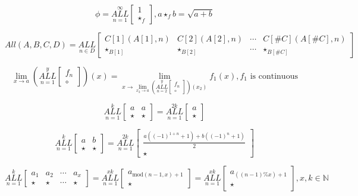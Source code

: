 \documentclass{article}
\begin{document}
$$\phi=\underset{n=1}{\overset{\infty}{ALL}} \begin{bmatrix}
1 \\
\star_f
\end{bmatrix}, a \star_f b = \sqrt{a+b}$$

$$All(A, B, C, D)=\underset{n \in D}{ALL} \begin{bmatrix}
C[1](A[1],n) & C[2](A[2],n) & \cdots & C[\#C](A[\#C],n) \\
\star_{B[1]}& \star_{B[2]} & \cdots & \star_{B[\#C]}
\end{bmatrix}$$

$$\underset{x \rightarrow a}{\lim} (\underset{n=1}{\overset{y}{ALL}} \begin{bmatrix}
f_n \\
\circ
\end{bmatrix})(x) = \underset{x \rightarrow \underset{x_2 \rightarrow a}{\lim} (\underset{n=2}{\overset{y}{ALL}} \begin{bmatrix}
f_n \\
\circ
\end{bmatrix})(x_2)}{\lim} f_1(x), f_1 \text{ is continuous}$$

$$\underset{n=1}{\overset{k}{ALL}} \begin{bmatrix}
a & a\\
\star & \star
\end{bmatrix} = \underset{n=1}{\overset{2k}{ALL}} \begin{bmatrix}
a\\
\star
\end{bmatrix}$$

$$\underset{n=1}{\overset{k}{ALL}} \begin{bmatrix}
a & b\\
\star & \star
\end{bmatrix} = \underset{n=1}{\overset{2k}{ALL}} \begin{bmatrix}
\frac{a\left(\left(-1\right)^{1+n}+1\right)+b\left(\left(-1\right)^{n}+1\right)}{2} \\
\star
\end{bmatrix}$$

$$\underset{n=1}{\overset{k}{ALL}} \begin{bmatrix}
a_1 & a_2 & \cdots & a_x\\
\star & \star & \cdots & \star
\end{bmatrix} = \underset{n=1}{\overset{xk}{ALL}} \begin{bmatrix}
a_{\text{mod}(n-1,x)+1}\\
\star
\end{bmatrix} = \underset{n=1}{\overset{xk}{ALL}} \begin{bmatrix}
a_{((n-1) \% x) + 1}\\
\star
\end{bmatrix}, x, k \in \mathbb{N}$$
\end{document}
